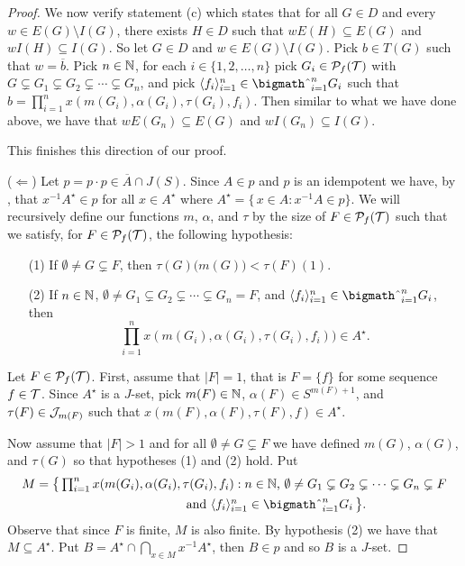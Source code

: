 \begin{proof}
  We now verify statement (c) which states that for all $G \in D$ and every $w \in E(G) \setminus I(G)$, there exists $H \in D$ such that $wE(H) \subseteq E(G)$ and $wI(H) \subseteq I(G)$.
  So let $G \in D$ and $w \in E(G) \setminus I(G)$. 
  Pick $b \in T(G)$ such that $w = \overline{b}$. 
  Pick $n \in \mathbb{N}$, for each $i \in \{1, 2, \ldots, n\}$ pick $G_i \in \mathcal{P}_f(\mathcal{T})$ with $G \subsetneq G_1 \subsetneq G_2 \subsetneq \cdots \subsetneq G_n$, and pick $\la f_i \ra_{i=1}^n \in \bigtimes_{i=1}^n G_i$ such that $b = \prod_{i=1}^n x(m(G_i), \alpha(G_i), \tau(G_i), f_i)$. 
  Then similar to what we have done above, we have that $wE(G_n) \subseteq E(G)$ and $wI(G_n) \subseteq I(G)$.

  This finishes this direction of our proof. 

  ($\Leftarrow$)
  Let $p = p \cdot p \in \overline{A} \cap J(S)$.
  Since $A \in p$ and $p$ is an idempotent we have, by \cite[Lemma 4.14]{Hindman:1998fk}, that $x^{-1}A^\star \in p$ for all $x \in A^\star$ where $A^\star = \{\, x \in A : x^{-1}A \in p\}$. 
  We will recursively define our functions $m$, $\alpha$, and $\tau$ by the size of $F \in \mathcal{P}_f(\mathcal{T})$ such that we satisfy, for $F \in \mathcal{P}_f(\mathcal{T})$, the following hypothesis:
  \begin{itemize}
    \item[(1)] If $\emptyset \ne G \subsetneq F$, then $\tau(G)\bigl( m(G) \bigr) < \tau(F)(1)$.
    
    \item[(2)] If $n \in \mathbb{N}$, $\emptyset \ne G_1 \subsetneq G_2 \subsetneq \cdots \subsetneq G_n = F$, and $\la f_i \ra_{i=1}^n \in \bigtimes_{i=1}^n G_i$, then \[\textstyle \prod_{i=1}^n x(m(G_i), \alpha(G_i), \tau(G_i), f_i)) \in A^\star.\]
  \end{itemize}

  Let $F \in \mathcal{P}_f(\mathcal{T})$.
  First, assume that $|F| = 1$, that is $F = \{f\}$ for some sequence $f \in \mathcal{T}$.
  Since $A^\star$ is a $J$-set, pick $m(F) \in \mathbb{N}$, $\alpha(F) \in S^{m(F)+1}$, and $\tau(F) \in \mathcal{J}_{m(F)}$ such that $x(m(F), \alpha(F), \tau(F), f) \in A^\star$. 

  Now assume that $|F| > 1$ and for all $\emptyset \ne G \subsetneq F$ we have defined $m(G)$, $\alpha(G)$, and $\tau(G)$ so that hypotheses (1) and (2) hold.
  Put 
  \begin{align*}
    M &= \bigl\{\, \textstyle \prod_{i=1}^n x(m(G_i), \alpha(G_i), \tau(G_i), f_i) : \mbox{$n \in \bbN$, $\emptyset \ne G_1 \subsetneq G_2 \subsetneq \cdots \subsetneq G_n \subsetneq F$} \\
    &\hspace{12em} \mbox{and $\la f_i \ra_{i=1}^n \in \bigtimes_{i=1}^n G_i$} \,\bigr\}.
  \end{align*}
  Observe that since $F$ is finite, $M$ is also finite.
  By hypothesis (2) we have that $M \subseteq A^\star$.
  Put $B = A^\star \cap \bigcap_{x \in M} x^{-1}A^\star$, then $B \in p$ and so $B$ is a $J$-set. 


\end{proof}

